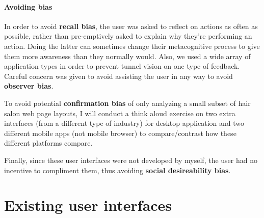 \paragraph{Avoiding bias}
In order to avoid \textbf{recall bias}, the user was asked to reflect on actions as often as possible, rather than pre-emptively asked to explain why they're performing an action. Doing the latter can sometimes change their metacognitive process to give them more awareness than they normally would. Also, we used a wide array of application types in order to prevent tunnel vision on one type of feedback. Careful concern was given to avoid assisting the user in any way to avoid \textbf{observer bias}.

To avoid potential \textbf{confirmation bias} of only analyzing a small subset of hair salon web page layouts, I will conduct a think aloud exercise on two extra interfaces (from a different type of industry) for desktop application and two different mobile apps (not mobile browser) to compare/contrast how these different platforms compare.

Finally, since these user interfaces were not developed by myself, the user had no incentive to compliment them, thus avoiding \textbf{social desireability bias}.


\section{Existing user interfaces}

